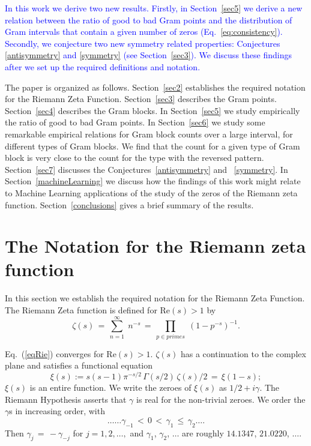 \documentclass[twoside]{article}
\theoremstyle{definition}
\begin{document}
\textcolor{blue}{In this work we derive two new results. Firstly, in Section~\ref{sec5} we derive a new relation between the ratio of good to bad Gram points and the distribution of Gram intervals that contain a given number of zeros (Eq.~\ref{eq:consistency}).  Secondly, we conjecture two new symmetry related properties: Conjectures \ref{antisymmetry} and \ref{symmetry}  (see  Section~\ref{sec3}). We discuss these findings after we set up the required definitions and notation. }

The paper is organized as follows.
Section~\ref{sec2} establishes the required notation for the 
Riemann Zeta Function. 
Section~\ref{sec3} describes the Gram points. 
Section~\ref{sec4} describes the Gram blocks. 
In Section~\ref{sec5} we study empirically the ratio of good to bad Gram points. 
In Section~\ref{sec6} we study some remarkable empirical relations for Gram block counts over a large interval, for different types of Gram blocks. We find that the count for
a given type of Gram block is very close to the count for the type with the reversed pattern. 
Section~\ref{sec7} discusses  {the Conjectures~\ref{antisymmetry} and ~\ref{symmetry}}. 
 {In Section~\ref{machineLearning} we discuss how the findings of this work might relate to Machine Learning applications of the study of the zeros of the Riemann zeta function.}
Section~\ref{conclusions} gives a brief summary of the results. 

\section{\label{sec2}The Notation for the Riemann zeta function }

In this section we  establish the required notation for the 
Riemann Zeta Function. 
The Riemann Zeta function is defined for $\mathrm{Re} (s) > 1$ by
\begin{equation}
\zeta ( s ) \, = \, \sum^{\infty}_{n = 1} \; n^{-s} \, = \, \prod_{p \in primes} \;
\left( 1 - p^{-s} \right)^{-1}.
\label{eqRie}
\end{equation}

Eq.~(\ref{eqRie})  converges for $\mathrm{Re} (s) > 1$.  
 $\zeta ( s )$ has a  continuation
to the complex plane and satisfies a functional equation \cite{Riemann(1858),Riemann 1892, Titchmarsh 1986,Edwards(1974)}
\begin{equation}  
\xi(s):=s(s-1) \pi^{-s/2} \, \Gamma (s/2) \, \zeta ( s )/2 \, = \, \xi ( 1 - s );
\label{eq:xifunc}
\end{equation}
$\xi(s)$ is an entire function. We
write the zeroes of $\xi(s)$ as $1/2 + i \gamma$. The Riemann Hypothesis  
asserts that $\gamma$ is real for the non-trivial zeroes.
We order the $\gamma$s in increasing order, with 
\begin{equation}
\ldots \ldots \gamma_{-1} \, < \, 0 \, < \, 
\gamma_1 \, \leq \, \gamma_2 \ldots. 
\end{equation}
Then $\gamma_j \, = \, - \gamma_{-j}$ for $j = 1, 2, \ldots,$ 
and    $\gamma_1$, $\gamma_2$, $\ldots$  are roughly
$14.1347$, $21.0220$, $\ldots$.
\end{document}
